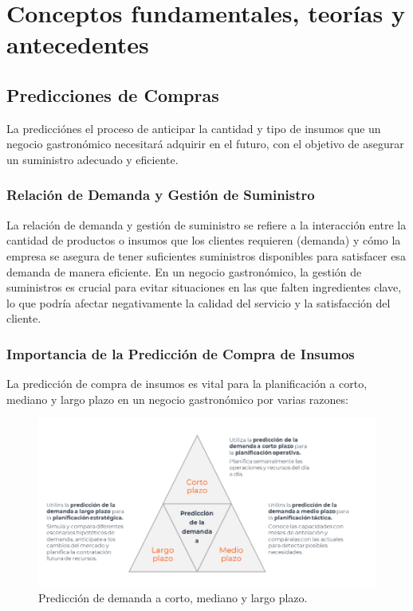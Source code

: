 \fancyhead{}
\fancyfoot{}
\newtheorem{teorema}{Teorema}
\cfoot{\thepage}


\chapter{Conceptos fundamentales, teorías y antecedentes}

\section{Predicciones de Compras}
La predicciónes el proceso de anticipar la cantidad y tipo de insumos que un negocio gastronómico necesitará adquirir en el futuro, con el objetivo de asegurar un suministro adecuado y eficiente.


\subsection{Relación de Demanda y Gestión de Suministro}

La relación de demanda y gestión de suministro se refiere a la interacción entre la cantidad de productos o insumos que los clientes requieren (demanda) y cómo la empresa se asegura de tener suficientes suministros disponibles para satisfacer esa demanda de manera eficiente. En un negocio gastronómico, la gestión de suministros es crucial para evitar situaciones en las que falten ingredientes clave, lo que podría afectar negativamente la calidad del servicio y la satisfacción del cliente.


\subsection{Importancia de la Predicción de Compra de Insumos}

La predicción de compra de insumos es vital para la planificación a corto, mediano y largo plazo en un negocio gastronómico por varias razones:

\begin{figure}[H]
  \begin{center}
    \includegraphics[scale=0.60]{./proceso_CMD_plazo.png}
    \caption{Predicción de demanda a corto, mediano y largo plazo.}
    \label{fig:proceso_inventario}
  \end{center}
\end{figure}

